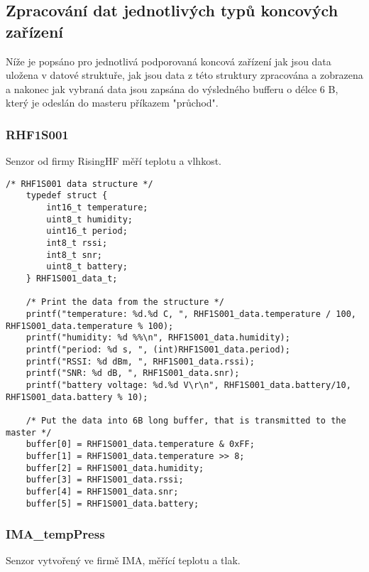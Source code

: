 \subsection{Zpracování dat jednotlivých typů koncových zařízení}
Níže je popsáno pro jednotlivá podporovaná koncová zařízení jak jsou data uložena v datové struktuře, jak jsou data z této struktury zpracována a zobrazena a nakonec jak vybraná data jsou zapsána do výsledného bufferu o délce 6 B, který je odeslán do masteru příkazem "průchod".

\subsubsection{RHF1S001}
Senzor od firmy RisingHF měří teplotu a vlhkost.

\begin{lstlisting}[style=CStyle]
    /* RHF1S001 data structure */   
    typedef struct {
        int16_t temperature;
        uint8_t humidity;
        uint16_t period;
        int8_t rssi;
        int8_t snr;
        uint8_t battery;
    } RHF1S001_data_t;

    /* Print the data from the structure */
	printf("temperature: %d.%d C, ", RHF1S001_data.temperature / 100, RHF1S001_data.temperature % 100);
	printf("humidity: %d %%\n", RHF1S001_data.humidity);
	printf("period: %d s, ", (int)RHF1S001_data.period);
	printf("RSSI: %d dBm, ", RHF1S001_data.rssi);
	printf("SNR: %d dB, ", RHF1S001_data.snr);
	printf("battery voltage: %d.%d V\r\n", RHF1S001_data.battery/10, RHF1S001_data.battery % 10);

    /* Put the data into 6B long buffer, that is transmitted to the master */
	buffer[0] = RHF1S001_data.temperature & 0xFF;
	buffer[1] = RHF1S001_data.temperature >> 8;
	buffer[2] = RHF1S001_data.humidity;
	buffer[3] = RHF1S001_data.rssi;
	buffer[4] = RHF1S001_data.snr;
	buffer[5] = RHF1S001_data.battery;
\end{lstlisting}


\subsubsection{IMA\_tempPress}
Senzor vytvořený ve firmě IMA, měřící teplotu a tlak.

